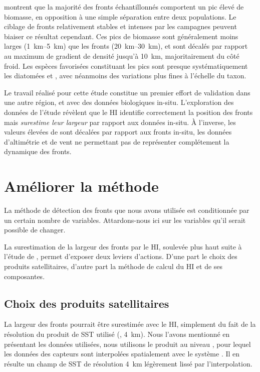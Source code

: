 \Textcite{mangolte_2023} montrent que la majorité des fronts échantillonnés comportent un pic élevé de biomasse, en opposition à une simple séparation entre deux populations.
Le ciblage de fronts relativement stables et intenses par les campagnes peuvent biaiser ce résultat cependant.
Ces pics de biomasse sont généralement moins larges (\qtyrange{1}{5}{\km}) que les fronts (\qtyrange{20}{30}{\km}), et sont décalés par rapport au maximum de gradient de densité jusqu'à \qty{10}{\km}, majoritairement du côté froid.
Les espèces favorisées constituant les pics sont presque systématiquement les diatomées et , avec néanmoins des variations plus fines à l'échelle du taxon.

Le travail réalisé pour cette étude  constitue un premier effort de validation dans une autre région, et avec des données biologiques in-situ.
L'exploration des données de l'étude révèlent que le HI identifie correctement la position des fronts mais \emph{surestime leur largeur} par rapport aux données in-situ.
À l'inverse, les valeurs élevées de  sont décalées par rapport aux fronts in-situ, les données d'altimétrie et de vent ne permettant pas de représenter complétement la dynamique des fronts.


\section{Améliorer la méthode}

La méthode de détection des fronts que nous avons utilisée  est conditionnée par un certain nombre de variables.
Attardons-nous ici sur les variables qu'il serait possible de changer.

La surestimation de la largeur des fronts par le HI, soulevée plus haut suite à l'étude de \textcite{mangolte_2023}, permet d'exposer deux leviers d'actions. D'une part le choix des produits satellitaires, d'autre part la méthode de calcul du HI et de ses composantes.

\subsection{Choix des produits satellitaires}

La largeur des fronts pourrait être surestimée avec le HI, simplement du fait de la résolution du produit de SST utilisé (, \qty{4}{\km}).
Nous l'avons mentionné en présentant les données utilisées, nous utilisons le produit  au niveau , pour lequel les données des capteurs sont interpolées spatialement avec le système .
Il en résulte un champ de SST de résolution \qty{4}{\km} légèrement lissé par l'interpolation.

